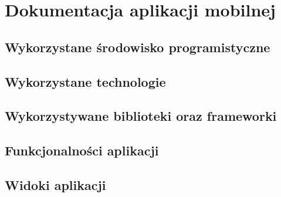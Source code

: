\documentclass[a4paper]{article}
\begin{document}
\section{Dokumentacja aplikacji mobilnej}

\subsection{Wykorzystane środowisko programistyczne}

\subsection{Wykorzystane technologie}

\subsection{Wykorzystywane biblioteki oraz frameworki}

\subsection{Funkcjonalności aplikacji}

\subsection{Widoki aplikacji}
\end{document}
